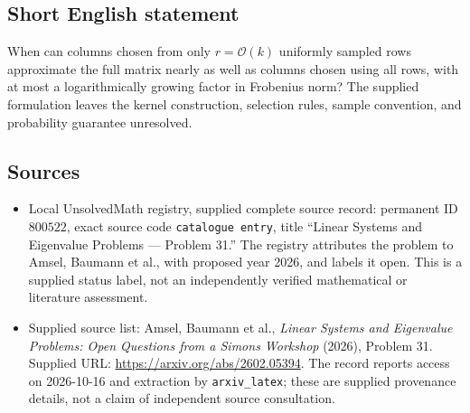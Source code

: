 \documentclass[11pt]{article}
\begin{document}
\subsection{Short English statement}
When can columns chosen from only \(r=\mathcal O(k)\) uniformly sampled rows approximate the full matrix nearly as well as columns chosen using all rows, with at most a logarithmically growing factor in Frobenius norm? The supplied formulation leaves the kernel construction, selection rules, sample convention, and probability guarantee unresolved.
\subsection{Sources}
\begin{itemize}
\item Local UnsolvedMath registry, supplied complete source record: permanent ID \(800522\), exact source code \texttt{catalogue entry}, title ``Linear Systems and Eigenvalue Problems --- Problem 31.'' The registry attributes the problem to Amsel, Baumann et al., with proposed year 2026, and labels it open. This is a supplied status label, not an independently verified mathematical or literature assessment.
\item Supplied source list: Amsel, Baumann et al., \emph{Linear Systems and Eigenvalue Problems: Open Questions from a Simons Workshop} (2026), Problem 31. Supplied URL: \url{https://arxiv.org/abs/2602.05394}. The record reports access on 2026-10-16 and extraction by \texttt{arxiv\_latex}; these are supplied provenance details, not a claim of independent source consultation.
\end{itemize}
\end{document}
